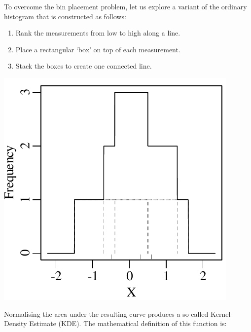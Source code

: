 To overcome the bin placement problem, let us explore a variant of the
ordinary histogram that is constructed as follows:
\begin{enumerate}
\item Rank the measurements from low to high along a line.
\item Place a rectangular `box' on top of each measurement.
\item Stack the boxes to create one connected line.
\end{enumerate}
\noindent\begin{minipage}[t][][b]{.3\textwidth}
  \includegraphics[width=\textwidth]{../figures/rectKDE.pdf}\medskip
\end{minipage}
\begin{minipage}[t][][t]{.7\textwidth}
  \label{fig:rectangles}
\end{minipage}

Normalising the area under the resulting curve produces a so-called
Kernel Density Estimate (KDE). The mathematical definition of this
function is:

